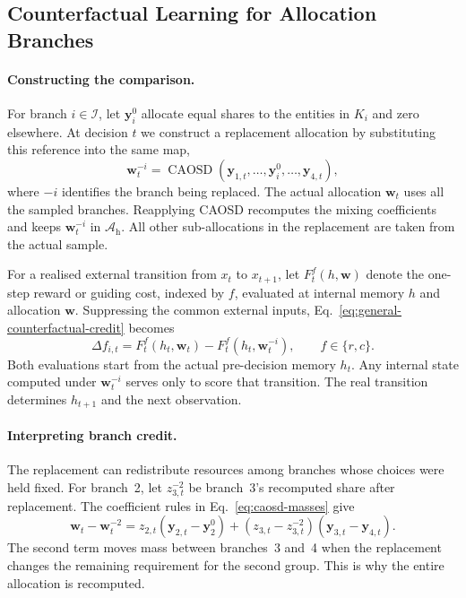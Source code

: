 \documentclass[10pt]{article}
\newcommand{\CAOSD}{\operatorname{CAOSD}}
\begin{document}
\subsection{Counterfactual Learning for Allocation Branches}
\label{sec:credit-analysis}

\paragraph{Constructing the comparison.}
For branch $i\in\mathcal I$, let $\bm y_i^0$ allocate equal shares to the entities in $K_i$ and zero elsewhere. At decision $t$ we construct a replacement allocation by substituting this reference into the same map,
\begin{equation}
  \bm w_t^{-i}
    =\CAOSD(\bm y_{1,t},\ldots,\bm y_i^0,\ldots,\bm y_{4,t}),
  \label{eq:counterfactual}
\end{equation}
where $-i$ identifies the branch being replaced. The actual allocation $\bm w_t$ uses all the sampled branches. Reapplying CAOSD recomputes the mixing coefficients and keeps $\bm w_t^{-i}$ in $\mathcal A_{\mathrm h}$. All other sub-allocations in the replacement are taken from the actual sample.

For a realised external transition from $x_t$ to $x_{t+1}$, let $F_t^f(h,\bm w)$ denote the one-step reward or guiding cost, indexed by $f$, evaluated at internal memory $h$ and allocation $\bm w$. Suppressing the common external inputs, Eq.~\eqref{eq:general-counterfactual-credit} becomes
\begin{equation}
  \Delta f_{i,t}
    =F_t^f(h_t,\bm w_t)-F_t^f(h_t,\bm w_t^{-i}),
  \qquad f\in\{r,c\}.
  \label{eq:counterfactual-signals}
\end{equation}
Both evaluations start from the actual pre-decision memory $h_t$. Any internal state computed under $\bm w_t^{-i}$ serves only to score that transition. The real transition determines $h_{t+1}$ and the next observation.

\paragraph{Interpreting branch credit.}
The replacement can redistribute resources among branches whose choices were held fixed. For branch~2, let $z_{3,t}^{-2}$ be branch~3's recomputed share after replacement. The coefficient rules in Eq.~\eqref{eq:caosd-masses} give
\begin{equation}
  \bm w_t-\bm w_t^{-2}
    =z_{2,t}(\bm y_{2,t}-\bm y_2^0)
     +(z_{3,t}-z_{3,t}^{-2})(\bm y_{3,t}-\bm y_{4,t}).
  \label{eq:coupling-identity}
\end{equation}
The second term moves mass between branches~3 and~4 when the replacement changes the remaining requirement for the second group. This is why the entire allocation is recomputed.
\end{document}
